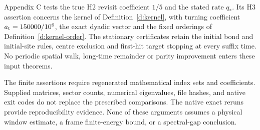 Appendix C tests the true H2 revisit coefficient \(1/5\) and
the stated rate \(q_*\). Its H3 assertion concerns the kernel of
Definition~\ref{d:kernel}, with turning coefficient
\(a_{\rm t}=150000/10^6\), the exact dyadic vector and the
fixed orderings of Definition~\ref{d:kernel-order}. The stationary
certificates retain the initial bond and initial-site rules,
centre exclusion and first-hit target stopping at every suffix
time. No periodic spatial walk, long-time remainder or parity
improvement enters these input theorems.

The finite assertions require regenerated mathematical index sets
and coefficients. Supplied matrices, sector counts, numerical
eigenvalues, file hashes, and native exit codes do not replace
the prescribed comparisons. The native exact reruns provide
reproducibility evidence. None of these
arguments assumes a physical window estimate, a frame finite-energy
bound, or a spectral-gap conclusion.
